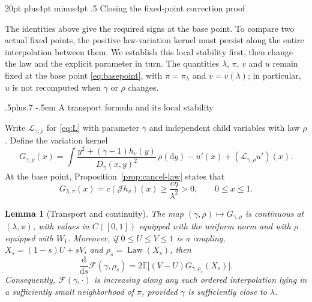 \documentclass[11pt,reqno]{amsart}
\makeatletter
\def\section{\@startsection{section}{1}{0pt}%
  {20pt plus4pt minus4pt}
  {.5\linespacing}
  {\normalfont\bfseries}}
\def\subsection{\@startsection{subsection}{2}{0pt}%
  {.5\linespacing plus.7\linespacing}
  {-.5em}
  {\normalfont\scshape}}
\theoremstyle{plain}
\newtheorem{lemma}[theorem]{Lemma}
\theoremstyle{definition}
\theoremstyle{remark}
\numberwithin{equation}{section}
\newcommand{\E}{\mathbb E}
\newcommand{\Law}{\operatorname{Law}}
\newcommand{\cJ}{\mathcal J}
\newcommand{\cL}{\mathcal L}
\newcommand{\cF}{\mathcal F}
\makeatother
\begin{document}
\section{Closing the fixed-point correction proof}\label{sec:comparison}

The identities above give the required signs at the base point. To compare
two actual fixed points, the positive law-variation kernel must persist
along the entire interpolation between them. We establish this local
stability first, then change the law and the explicit parameter in turn.
The quantities $\lambda$, $\pi$, $v$ and $u$ remain fixed at the
base point \eqref{eq:basepoint}, with $\pi=\pi_\lambda$ and
$v=v(\lambda)$; in particular, $u$ is not recomputed
when $\gamma$ or $\rho$ changes.

\subsection{A transport formula and its local stability}

Write $\cL_{\gamma,\rho}$ for \eqref{eq:L} with parameter $\gamma$ and
independent child variables with law $\rho$. Define the variation kernel
\begin{equation}\label{eq:G-field}
 G_{\gamma,\rho}(x)
 =\int\frac{y^2+(\gamma-1)h_v(y)}{D_\gamma(x,y)^2}\,\rho(\mathrm dy)
   -u'(x)+(\cL_{\gamma,\rho}u')(x).
\end{equation}
At the base point, Proposition~\ref{prop:cancel-law} states that
\begin{equation}\label{eq:G-base}
 G_{\lambda,\pi}(x)=c(\cJ h_v)(x)
 \ge\frac{c\eta}{\lambda^2}>0,\qquad 0\le x\le1.
\end{equation}

\begin{lemma}[Transport and continuity]\label{lem:transport}
The map $(\gamma,\rho)\mapsto G_{\gamma,\rho}$ is continuous at
$(\lambda,\pi)$, with values in $C([0,1])$ equipped with the uniform norm and
with $\rho$ equipped with $W_1$.
Moreover, if $0\le U\le V\le1$ is a coupling, $X_s=(1-s)U+sV$, and
$\rho_s=\Law(X_s)$, then
\begin{equation}\label{eq:transport-formula}
 \frac{\mathrm d}{\mathrm ds}\cF(\gamma,\rho_s)
 =2\E\bigl[(V-U)G_{\gamma,\rho_s}(X_s)\bigr].
\end{equation}
Consequently, $\cF(\gamma,\cdot)$ is increasing along any such ordered
interpolation lying in a sufficiently small neighborhood of $\pi$, provided
$\gamma$ is sufficiently close to $\lambda$.
\end{lemma}
\end{document}
